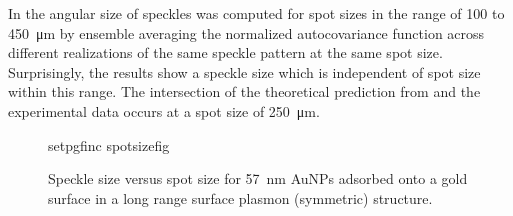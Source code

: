 In  the angular size of speckles was computed for spot
sizes in the range of 100 to \SI{450}{\micro\meter} by ensemble averaging the
normalized autocovariance function across different realizations of the same
speckle pattern at the same spot size.  Surprisingly, the results show a
speckle size which is independent of spot size within this range.  The
intersection of the theoretical prediction from  and
the experimental data occurs at a spot size of \SI{250}{\micro\meter}.  
\begin{figure}[ht]
\centering
{setpgfinc}
{spotsizefig}
\caption{Speckle size versus spot size for \SI{57}{\nano\meter} AuNPs adsorbed
onto a gold surface in a long range surface plasmon (symmetric) structure.}
\label{fig:spotsize}
\end{figure}

